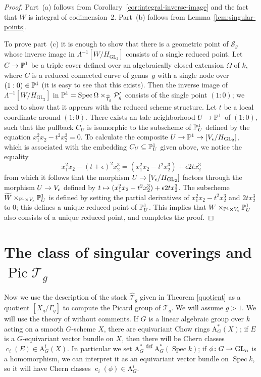 \documentclass{amsart}
\numberwithin{equation}{section}
\numberwithin{subsection}{section}
\theoremstyle{definition}
\theoremstyle{remark}
\newcommand\cS{\mathcal{S}} \newcommand\cT{\mathcal{T}}
\newcommand\rA{\mathrm{A}} \newcommand\rB{\mathrm{B}}
\newcommand\arr{\ifinner\to\else\longrightarrow\fi}
\newcommand\arrto{\ifinner\mapsto\else\longmapsto\fi}
\newcommand\eqdef{\overset{\mathrm{\scriptscriptstyle def}} =}
\newcommand\pic{\operatorname{Pic}}
\newcommand\spec{\operatorname{Spec}}
\newcommand{\T}[1][g]{\cT_{#1}}
\newcommand{\OT}[1][g]{\widehat{\cT}_{#1}}
\newcommand{\GL}{\mathrm{GL}}
\newcommand\Hg{H_{\GL_2}}
\newcommand\Ve{V_{\epsilon}}
\newcommand{\ch}{\operatorname{c}}
\begin{document}
\begin{proof}
Part~(a) follows from Corollary~\ref{cor:integral-inverse-image} and the fact that $W$ is integral of codimension~2. Part~(b) follows from Lemma~\ref{lem:singular-points}.

To prove part~(c) it is enough to show that there is a geometric point of $\cS_{g}$ whose inverse image in $\Lambda^{-1}[W/ \Hg]$ consists of a single reduced point. Let $C \arr \PP^{1}$ be a triple cover defined over an algebraically closed extension $\Omega$ of $k$, where $C$ is a reduced connected curve of genus~$g$ with a single node over $(1:0) \in \mathbb{P}^{1}$ (it is easy to see that this exists). Then the inverse image of $\Lambda^{-1}[W/ \Hg]$ in $\PP^{1} = \spec\Omega\times_{\OT}\cP'_{g}$ consists of the single point $(1:0)$; we need to show that it appears with the reduced scheme structure. Let $t$ be a local coordinate around $(1:0)$. There exists an tale neighborhood $U \arr \PP^{1}$ of $(1:0)$, such that the pullback $C_{U}$ is isomorphic to the subscheme of $\mathbb{P}^{1}_{U}$ defined by the equation $x_{1}^{2}x_{2} - t^{2}x_{2}^{3} = 0$. To calculate the composite $U \arr \PP^{1} \arr [\Ve/\Hg]$, which is associated with the embedding $C_{U} \subseteq \mathbb{P}^{1}_{U}$ given above, we notice the equality
   \[
   x_{1}^{2}x_{2} - (t + \epsilon)^{2}x_{2}^{3}
      = (x_{1}^{2}x_{2} - t^{2}x_{2}^{3})
      +\epsilon 2tx_{2}^{3}
   \]
from which it follows that the morphism $U \arr [\Ve/\Hg]$ factors through the morphism $U \arr \Ve$ defined by $t \arrto (x_{1}^{2}x_{2} - t^{2}x_{2}^{3}) + \epsilon 2tx_{2}^{3}$. The subscheme $\widetilde{W}\times_{\PP^{1}\times\Ve}\PP^{1}_{U}$ is defined by setting the partial derivatives of $x_{1}^{2}x_{2} - t^{2}x_{2}^{3}$ and $2tx_{2}^{3}$ to $0$; this defines a unique reduced point of $\mathbb{P}^{1}_{U}$. This implies that $W\times_{\PP^{1}\times\Ve}\PP^{1}_{U}$ also consists of a unique reduced point, and completes the proof.
\end{proof}




\section{The class of singular coverings and $\pic \T$}\label{secpic}

Now we use the description of the stack $\OT$ given in Theorem \ref{quotient} as a quotient $[X_{g}/\Gamma_{g}]$ to compute the Picard group of $\T$. We will assume $g > 1$. We will use the theory of \cite{edieit} without comments. If $G$ is a linear algebraic group over $k$ acting on a smooth $G$-scheme $X$, there are equivariant Chow rings $\rA^{*}_{G}(X)$; if $E$ is a $G$-equivariant vector bundle on $X$, then there will be Chern classes $\ch_{i}(E) \in \rA^{i}_{G}(X)$. In particular we set $\rA^{*}_{G} \eqdef \rA^{*}_{G}(\spec k)$; if $\phi\colon G \arr \GL_{n}$ is a homomorphism, we can interpret it as an equivariant vector bundle on $\spec k$, so it will have Chern classes $\ch_{i}(\phi) \in \rA^{i}_{G}$.
\end{document}
